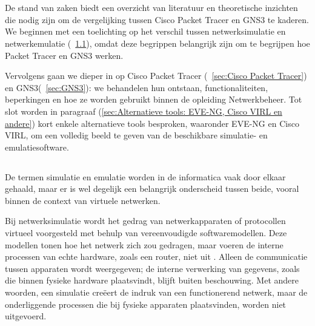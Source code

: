 \chapter{}%
\label{ch:stand-van-zaken}

De stand van zaken biedt een overzicht van literatuur en theoretische inzichten die nodig zijn om de vergelijking tussen Cisco Packet Tracer en GNS3 te kaderen. We beginnen met een toelichting op het verschil tussen netwerksimulatie en netwerkemulatie (~\ref{sec:netwerksimulatie-vs-netwerkemulatie}), omdat deze begrippen belangrijk zijn om te begrijpen hoe Packet Tracer en GNS3 werken.

\vspace{0.3cm}

 Vervolgens gaan we dieper in op Cisco Packet Tracer (~\ref{sec:Cisco Packet Tracer}) en GNS3(~\ref{sec:GNS3}): we behandelen hun ontstaan, functionaliteiten, beperkingen en hoe ze worden gebruikt binnen de opleiding Netwerkbeheer. Tot slot worden in paragraaf (\ref{sec:Alternatieve tools: EVE-NG, Cisco VIRL en andere}) kort enkele alternatieve tools besproken, waaronder EVE-NG en Cisco VIRL, om een volledig beeld te geven van de beschikbare simulatie- en emulatiesoftware.
\section{}%
\label{sec:netwerksimulatie-vs-netwerkemulatie}

De termen simulatie en emulatie worden in de informatica vaak door elkaar gehaald, maar er is wel degelijk een belangrijk onderscheid tussen beide, vooral binnen de context van virtuele netwerken.

\vspace{0.2cm}

Bij netwerksimulatie wordt het gedrag van netwerkapparaten of protocollen virtueel voorgesteld met behulp van vereenvoudigde softwaremodellen. Deze modellen tonen hoe het netwerk zich zou gedragen, maar voeren de interne processen van echte hardware, zoals een router, niet uit \autocite{GOMEZ2023}. Alleen de communicatie tussen apparaten wordt weergegeven; de interne verwerking van gegevens, zoals die binnen fysieke hardware plaatsvindt, blijft buiten beschouwing. Met andere woorden, een simulatie creëert de indruk van een functionerend netwerk, maar de onderliggende processen die bij fysieke apparaten plaatsvinden, worden niet uitgevoerd.

